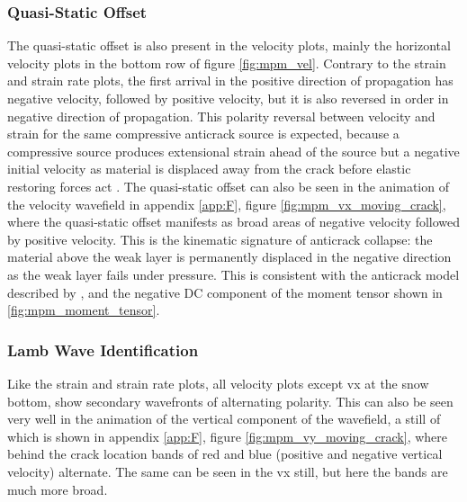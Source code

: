 \subsubsection{Quasi-Static Offset}
The quasi-static offset is also present in the velocity plots, mainly the horizontal velocity plots in the bottom row of figure \ref{fig:mpm_vel}. Contrary to the strain and strain rate plots, the first arrival in the positive direction of propagation has negative velocity, followed by positive velocity, but it is also reversed in order in negative direction of propagation. This polarity reversal between velocity and strain for the same compressive anticrack source is expected, because a compressive source produces extensional strain ahead of the source but a negative initial velocity as material is displaced away from the crack before elastic restoring forces act \parencite{kAkiRichards19801981}. The quasi-static offset can also be seen in the animation of the velocity wavefield in appendix \ref{app:F}, figure \ref{fig:mpm_vx_moving_crack}, where the quasi-static offset manifests as broad areas of negative velocity followed by positive velocity. This is the kinematic signature of anticrack collapse: the material above the weak layer is permanently displaced in the negative direction as the weak layer fails under pressure. This is consistent with the anticrack model described by \cite{mcclungFractureMechanicalModels1981}, and the negative DC component of the moment tensor shown in \ref{fig:mpm_moment_tensor}. 

\subsubsection{Lamb Wave Identification}

Like the strain and strain rate plots, all velocity plots except vx at the snow bottom, show secondary wavefronts of alternating polarity. This can also be seen very well in the animation of the vertical component of the wavefield, a still of which is shown in appendix \ref{app:F}, figure \ref{fig:mpm_vy_moving_crack}, where behind the crack location bands of red and blue (positive and negative vertical velocity) alternate. The same can be seen in the vx still, but here the bands are much more broad. \par

